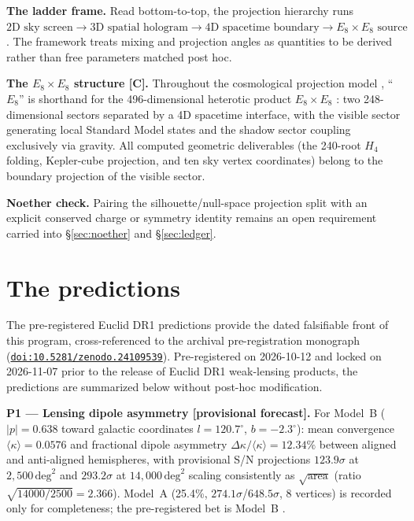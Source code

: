 \documentclass[11pt]{article}
\newcommand{\doi}[1]{\href{https://doi.org/#1}{\nolinkurl{doi:#1}}}
\begin{document}
\noindent\textbf{The ladder frame.} Read bottom-to-top, the projection hierarchy runs $2\text{D sky screen} \to 3\text{D spatial hologram} \to 4\text{D spacetime boundary} \to E_8 \times E_8 \text{ source}$. The framework treats mixing and projection angles as quantities to be derived rather than free parameters matched post hoc.

\noindent\textbf{The $E_8 \times E_8$ structure [C].} Throughout the cosmological projection model \cite{predictions-paper}, ``$E_8$'' is shorthand for the 496-dimensional heterotic product $E_8 \times E_8$ \cite{candelas}: two 248-dimensional sectors separated by a 4D spacetime interface, with the visible sector generating local Standard Model states and the shadow sector coupling exclusively via gravity. All computed geometric deliverables (the 240-root $H_4$ folding, Kepler-cube projection, and ten sky vertex coordinates) belong to the boundary projection of the visible sector.

\noindent\textbf{Noether check.} Pairing the silhouette/null-space projection split with an explicit conserved charge or symmetry identity remains an open requirement carried into \S\ref{sec:noether} and \S\ref{sec:ledger}.

\section{The predictions}
\label{sec:predictions}
The pre-registered Euclid DR1 predictions provide the dated falsifiable front of this program, cross-referenced to the archival pre-registration monograph \cite{predictions-paper} (\doi{10.5281/zenodo.24109539}). Pre-registered on 2026-10-12 and locked on 2026-11-07 prior to the release of Euclid DR1 weak-lensing products, the predictions are summarized below without post-hoc modification.

\noindent\textbf{P1 --- Lensing dipole asymmetry [provisional forecast].} For Model~B ($|p| = 0.638$ toward galactic coordinates $l = 120.7^\circ$, $b = -2.3^\circ$): mean convergence $\langle\kappa\rangle = 0.0576$ and fractional dipole asymmetry $\Delta\kappa/\langle\kappa\rangle = 12.34\%$ between aligned and anti-aligned hemispheres, with provisional S/N projections $123.9\sigma$ at $2{,}500\,\mathrm{deg}^2$ and $293.2\sigma$ at $14{,}000\,\mathrm{deg}^2$ scaling consistently as $\sqrt{\mathrm{area}}$ (ratio $\sqrt{14000/2500} = 2.366$). Model~A (25.4\%, $274.1\sigma$/$648.5\sigma$, 8 vertices) is recorded only for completeness; the pre-registered bet is Model~B \cite{predictions-paper}.
\end{document}

